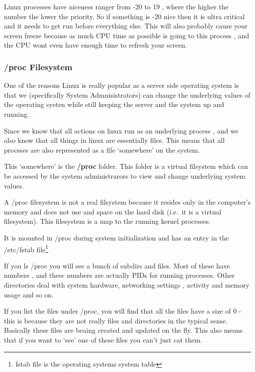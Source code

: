 Linux processes have niceness ranger from -20 to 19 , where the higher the
number the lower the priority. So if something is -20 nice then it is ultra
critical and it needs to get run before everything else. This will also probably
cause your screen freeze because as much CPU time as possible is going to this
process , and the CPU wont even have enough time to refresh your screen.


\subsubsectionend

\subsubsection{/proc Filesystem}
\label{sssec:proc_filesystem}

One of the reasons Linux is really popular as a server side operating system is
that we (specifically System Admnisistrators) can change the underlying values
of the operating systen while still keeping the server and the system up and
running.

Since we know that all actions on linux run as an underlying process , and we
also know that all things in linux are essentially files. This means that all
procsses are also represented as a file `somewhere' on the system.

This `somewhere' is the \textbf{/proc} folder. This folder is a virtual
filsystem which can be accessed by the system administrarors to view and change
underlying system values.

A /proc filesystem is not a real filsystem because it resides only in the
computer's memory and does not use and space on the hard disk (i.e.\ it is a
virtual filesystem). This filesystem is a map to the running kernel processes.

It is mounted in /proc during system initialization and has an entry in the
/etc/fstab file\footnote{fstab file is the operating systems system table}

If you ls /proc you will see a bunch of subdirs and files. Most of these have
numbers , and these numbers are actually PIDs for running processes. Other
directories deal with system hardware, networking settings , activity and memory
usage and so on.

If you list the files under /proc, you will find that all the files have a size
of 0 - this is because they are not really files and directories in the typical
sense. Basically these files are beaing created and updated on the fly.  This
also means that if you want to `see' one of these files you can't just cat them.

